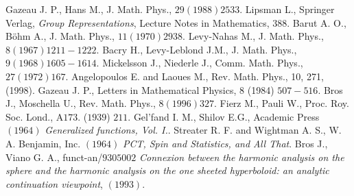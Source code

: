 \documentclass[a4paper,11pt,showpacs,preprintnumbers]{revtex4}
\begin{document}
\begin{thebibliography}{99}
 Gazeau J. P.,  Hans M., J. Math. Phys.,
$29 (1988) 2533$.
 Lipsman L., Springer Verlag, {\it Group
Representations}, Lecture Notes in Mathematics, $388$.
 Barut A. O., B\"ohm  A., J. Math.
Phys., $11 (1970) 2938$.
 Levy-Nahas M., J. Math.
Phys., $8 (1967) 1211-1222$.
 Bacry H., Levy-Leblond J.M., J. Math.
Phys., $9 (1968) 1605-1614$.
 Mickelsson J., Niederle J., Comm.
Math. Phys., $27 (1972) 167$.
  Angelopoulos E. and Laoues M.,
Rev.  Math. Phys., 10, 271, (1998).
 Gazeau J. P., Letters in Mathematical Physics, 8
(1984) $507-516$.
 Bros J., Moschella U., Rev. Math.
Phys., $8 (1996) 327$.
 Fierz M.,  Pauli W., Proc. Roy. Soc. Lond.,
 A$173$. ($1939$) $211$.
 Gel'fand I. M., Shilov E.G., Academic
Press $ (1964) $ {\it  Generalized functions, Vol. I.}.
 Streater R. F. and Wightman A. S., W.
A. Benjamin, Inc. $(1964)$  {\it PCT, Spin and Statistics, and All
That}.
 Bros J., Viano G. A., funct-an/$9305002$ {\it Connexion between the harmonic analysis
on the sphere and the harmonic analysis on the one sheeted
hyperboloid: an analytic continuation viewpoint}, $(1993)$.

\end{thebibliography}
\end{document}
